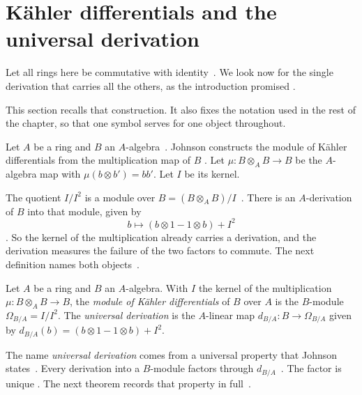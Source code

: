 \section{Kähler differentials and the universal derivation}\label{sec:commutative:kahler}

Let all rings here be commutative with identity~\cite[p.~93]{Johnson1969Kahler}. We look now for the single
derivation that carries all the others, as the introduction promised
\cite[p.~93]{Johnson1969Kahler}.

This section recalls that construction. It also fixes the notation used in
the rest of the chapter, so that one symbol serves for one object throughout.

Let $A$ be a ring and $B$ an $A$-algebra~\cite[p.~93]{Johnson1969Kahler}. Johnson constructs the module of
Kähler differentials from the multiplication map of $B$
\cite[p.~93]{Johnson1969Kahler}. Let $\mu\colon B\otimes_A B \to B$ be the
$A$-algebra map with $\mu(b\otimes b') = bb'$. Let $I$ be its kernel.

The quotient $I/I^2$ is a module over $B = (B\otimes_A B)/I$~\cite[p.~93]{Johnson1969Kahler}. There is an
$A$-derivation of $B$ into that module, given by
\[
  b \longmapsto (b\otimes 1 - 1\otimes b) + I^2
\]
\cite[p.~93]{Johnson1969Kahler}. So the kernel of the multiplication already
carries a derivation, and the derivation measures the failure of the two
factors to commute. The next definition names both
objects~\cite[p.~93]{Johnson1969Kahler}.

\begin{definition}\label{def:comm:kahler}
Let $A$ be a ring and $B$ an $A$-algebra. With $I$ the kernel of the
multiplication $\mu\colon B\otimes_A B\to B$, the \emph{module of Kähler
differentials} of $B$ over $A$ is the $B$-module
$\Omega_{B/A} = I/I^2$. The \emph{universal derivation} is the $A$-linear map
$d_{B/A}\colon B \to \Omega_{B/A}$ given by
$d_{B/A}(b) = (b\otimes 1 - 1\otimes b) + I^2$.
\end{definition}

The name \emph{universal derivation} comes from a universal property that
Johnson states~\cite[p.~92]{Johnson1969Kahler}. Every derivation into a $B$-module factors through
$d_{B/A}$~\cite[p.~92]{Johnson1969Kahler}. The factor is unique
\cite[p.~92]{Johnson1969Kahler}. The next theorem records that property in
full~\cite[p.~92]{Johnson1969Kahler}.

